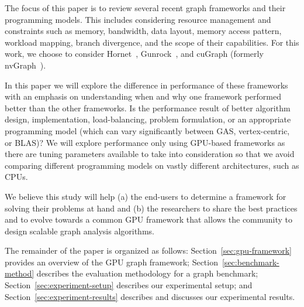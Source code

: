 The focus of this paper is to review several recent graph frameworks and their programming models. This includes considering resource management and constraints such as memory, bandwidth, data layout, memory access pattern, workload mapping, branch divergence, and the scope of their capabilities. For this work, we choose to consider Hornet~\cite{green-hornet}, Gunrock~\cite{wang2017gunrock}, and cuGraph (formerly nvGraph~\cite{nvGraph}).

In this paper we will explore the difference in performance of these frameworks with an emphasis on understanding when and why one framework performed better than the other  frameworks. Is the performance result of better algorithm design, implementation, load-balancing, problem formulation, or an appropriate programming model (which can vary significantly between GAS, vertex-centric, or BLAS)?  We will explore performance only using GPU-based frameworks as there are tuning parameters available to take into consideration so that we avoid comparing different programming models on vastly different architectures, such as CPUs.



We believe this study will help (a) the end-users to determine a framework for solving their problems at hand and (b) the researchers to share the best practices and to evolve towards a common GPU framework that allows the community to design scalable graph analysis algorithms.


The remainder of the paper is organized as follows: Section~\ref{sec:gpu-framework} provides an overview of the GPU graph framework; Section~\ref{sec:benchmark-method} describes the evaluation methodology for a graph benchmark; Section~\ref{sec:experiment-setup} describes our experimental setup; and Section~\ref{sec:experiment-results} describes and discusses our experimental results.
